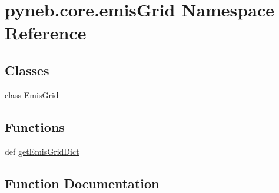 \hypertarget{namespacepyneb_1_1core_1_1emis_grid}{}\section{pyneb.\+core.\+emis\+Grid Namespace Reference}
\label{namespacepyneb_1_1core_1_1emis_grid}
\subsection*{Classes}
\begin{DoxyCompactItemize}
\item 
class \hyperlink{classpyneb_1_1core_1_1emis_grid_1_1_emis_grid}{Emis\+Grid}
\end{DoxyCompactItemize}
\subsection*{Functions}
\begin{DoxyCompactItemize}
\item 
def \hyperlink{namespacepyneb_1_1core_1_1emis_grid_a377d90568cd9c52e35ebae2ac9a3c386}{get\+Emis\+Grid\+Dict}
\end{DoxyCompactItemize}


\subsection{Function Documentation}
\hypertarget{namespacepyneb_1_1core_1_1emis_grid_a377d90568cd9c52e35ebae2ac9a3c386}{}
